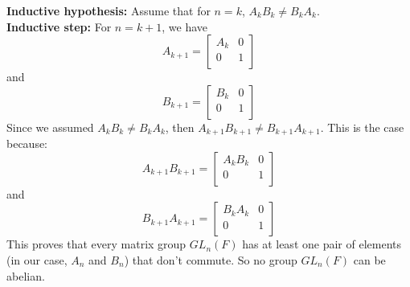\documentclass[12pt]{article}
\begin{document}
    \textbf{Inductive hypothesis:} Assume that for $n = k$,
    $A_kB_k \neq B_kA_k$. \\
    \textbf{Inductive step:} For $n = k + 1$, we have
    \[ A_{k+1} =
    \begin{bmatrix}
    A_k & 0 \\
    0 & 1 \\
    \end{bmatrix}\]
    and 
    \[ B_{k+1} =
    \begin{bmatrix}
    B_k & 0 \\
    0 & 1 \\
    \end{bmatrix} \]
    Since we assumed $A_kB_k \neq B_kA_k$,
    then $A_{k+1}B_{k+1} \neq B_{k+1}A_{k+1}$.
    This is the case because:
    \[ A_{k+1}B_{k+1} = 
    \begin{bmatrix}
    A_kB_k & 0 \\
    0 & 1 \\
    \end{bmatrix}\]
    and 
    \[ B_{k+1}A_{k+1} =
    \begin{bmatrix}
    B_kA_k & 0 \\
    0 & 1 \\
    \end{bmatrix}\]
    This proves that every matrix group $GL_n(F)$ has at least one
    pair of elements (in our case, $A_n$ and $B_n$) that don't commute.
    So no group $GL_n(F)$ can be abelian.
\end{document}
